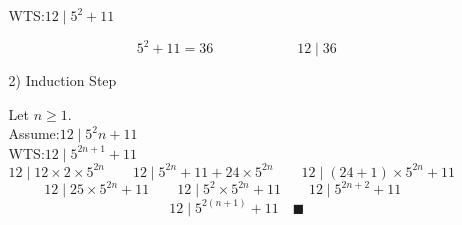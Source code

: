 \documentclass[12pt]{exam}
\begin{document}
\begin{enumerate}
\begin{enumerate}
            WTS:\qquad $12\mid5^2+11$

        \[
            5^2+11=36\qquad\qquad\qquad
            12\mid36
        \]
        \item[2)] Induction Step

            Let $n\geq1$.\\
            Assume:\qquad $12\mid5^2n+11$\\
	        WTS:\qquad $12\mid5^{2n+1}+11$
	   \[
	        12\mid12\times2\times5^{2n}\qquad
	        12\mid5^{2n}+11+24\times5^{2n}\qquad
	        12\mid(24+1)\times5^{2n}+11\qquad
	    \]
	    \[
	        12\mid25\times5^{2n}+11\qquad
	        12\mid5^{2}\times5^{2n}+11\qquad
	        12\mid5^{2n+2}+11\qquad
        \]
	    \[
	        12\mid5^{2(n+1)}+11\quad\blacksquare
	    \]
    \end{enumerate}		
\end{enumerate}
\end{document}
